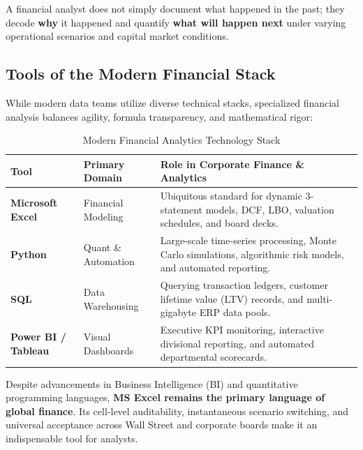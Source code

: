 \documentclass[11pt,a4paper]{article}
\begin{document}
\begin{keyconcept}
A financial analyst does not simply document what happened in the past; they decode \textbf{why} it happened and quantify \textbf{what will happen next} under varying operational scenarios and capital market conditions.
\end{keyconcept}

\subsection{Tools of the Modern Financial Stack}

While modern data teams utilize diverse technical stacks, specialized financial analysis balances agility, formula transparency, and mathematical rigor:

\begin{table}[htbp]
\centering
\small
\begin{tabular}{L{3.2cm} L{3.5cm} L{7.5cm}}
\toprule
\textbf{Tool} & \textbf{Primary Domain} & \textbf{Role in Corporate Finance \& Analytics} \\
\midrule
\textbf{Microsoft Excel} & Financial Modeling & Ubiquitous standard for dynamic 3-statement models, DCF, LBO, valuation schedules, and board decks. \\
\textbf{Python} & Quant \& Automation & Large-scale time-series processing, Monte Carlo simulations, algorithmic risk models, and automated reporting. \\
\textbf{SQL} & Data Warehousing & Querying transaction ledgers, customer lifetime value (LTV) records, and multi-gigabyte ERP data pools. \\
\textbf{Power BI / Tableau} & Visual Dashboards & Executive KPI monitoring, interactive divisional reporting, and automated departmental scorecards. \\
\bottomrule
\end{tabular}
\caption{Modern Financial Analytics Technology Stack}
\label{tab:tech-stack}
\end{table}

\begin{financeapp}
Despite advancements in Business Intelligence (BI) and quantitative programming languages, \textbf{MS Excel remains the primary language of global finance}. Its cell-level auditability, instantaneous scenario switching, and universal acceptance across Wall Street and corporate boards make it an indispensable tool for analysts.
\end{financeapp}
\end{document}
